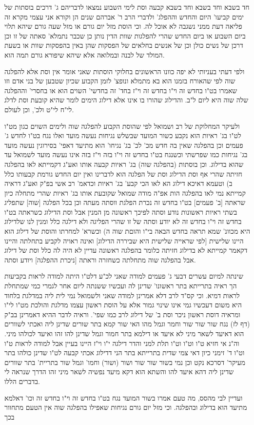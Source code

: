 \documentclass[12pt, openany]{book}
\begin{document}
חד בשבא וחד בשבא וחד בשבא קבעה וסת לימי השבוע נמצאו לדבריהם ג' דרכים בוסתות של ימים קביעו' היום והחדש וההפלג' ולדברי הרב ר' אברהם שנים הן וקורא אני עצמי מקרא זה פליאה דעת ממני נשגבה לא אוכל לה. וכי הוסת מזל יום גורם או מזל שעה גורם שיהא תלוי ביום השבוע או ביום החדש שהרי להפלגות שוות הדין נותן כן שכבר נתמלא' סאתה של זו וכן דרכן של נשים כולן וכן של אנשים בחלאים של הפסקות שהן באין בהפסקות שוות או בשעת המולד של לבנה ובמלואה אלא שיהא שיפורא גורם תמה הוא.\par ולפי דעתי בעניותי לא יפה כוונו הראשונים בחלוקי הוסתות שאני אומר אין וסת אלא להפלגה שוה לפי שהאורח בזמנו הוא בא מתמלא ונופצ' לזמן הקבוע שכיון שטבען של בני אדם וזו שאמרו בט"ו בחדש זה וי"ו בחדש זה וי"ז בחד' זה בחדשי' השוים הוא או בחסרי' וההפלגה שלה שוה היא ליום ל"ב. והדילוג שהורו בו אינו אלא דילוג הימים לומר שהיא קובעת וסת לדלג לי"ח לי"ט ולכ', וכן לעולם.\par ולעיקר המחלוקת של רב ושמואל לפי שהוסת הקבוע להפלגה שוה ולימים השוים כגון מט"ו לט"ו בג' ראיות הוא נקבע כשור המועד שבשלש נגיחות נעשה מועד ואלו נגח בט"ו לחדש ג' פעמים וכן בהפלגה שאין בה חדש מכ' לכ' בג' נגיחו' הוא מתיעד דאפי' בסירוגין נעשה מועד בג' נגיחות כמו שפרשתי וכשנגח בט"ו בחדש זה וי"ו בזה וי"ז בזה אינו נעשה מועד לשמואל עד שהוא בדילוג. וכן בוסתות (בהפלגה שוה) בג' ראיות קבעה אותו ואע"ג דקמייתא לאו בהפלגה חזיתה שהרי אף וסת הדילוג וסת של הפלגה הוא לדברינו ואין יום החדש גורמת קבעותו כלל ב) וטעמא דאיכא דילוג הא לאו הכי קבע' בג' ראיות וכדאמ' רב אשי בפ"ק ואע"ג דראיה קמייתא נמי לאו בהפלגה הות אפ"ה מודה שמואל שקובעת אותו בג' ראיות שהרי מתחלה כיון שראתה [ב' פעמים] בט"ו בחדש זה נכרת הפלגת ווסתה מעתה וכן בכל הפלגה [שוה] שתפליג בשתי ראיות ראשונות נודע וסתה לפיכך ראשונה מן המנין אבל וסת הדילוג כשראתה בט"ו בחדש זה וי"ו בחדש זה לא יודע וסתה של זו שהרי הפליגה ולא דילגה כלל ומנין לנו שלדילוג היא מכוונ' שמא תראה בחדש הבאה בי"ו והוםת שוה ה) וכשרא' למחרתו והוסת של דילוג הוא היינו שלישית {\small [לפי שראייה שלישית היא שביררה הדילוג]} ואינה ראויה לקביע בתחלתה והיינו דקאמר קמייתא לא בדילוג חזיתה כלומר בהפלגה ראשונה עדיין לא היה לה כלל וסת של דילוג אבל בהפלגה שוה מתחלתה כשחזרה וראתה [ניכרת ההפלגה] ויודע וסתה.\par [והא דאמרינן] שינתה למיום עשרים דבעי ג' פעמים למודה שאני לכ"ע דלט"ו היתה למודה לראות בקביעות הך ראיה בתרייתא בתר ראשונו' שדינן לה ועכשיו ששנתה ליום אחר לגמרי כמי שמתחלת לראות דמיא. וכי קס"ד לרב דלא אמרינן למודה שאני ולשמואל נמי לית ליה במדלגת בלחוד היא משום דעכשיו גמי אינו שינוי גמור אלא על הוסת ראשון עצמו מדלגת והולכת מט"ו לי"ו ומראיה דוסת ראשון ניכר וסת ב' של דילוג לרב כמו שפי'. וראיה לדבר ההיא דאמרינן בב"ק (דף לז) נגח שור שור שור וחמר וגמל מהו האי שור קמא בתר שורים שדינן ליה ואכתי לשוורים הוא דאיעד לשאר מיני לא איעד או דילמא בתר חמור וגמל שדינן להו זהו ואיעד לכולהו מיני. וה"נ אי חזיא ט"ו וט"ו וט"ו תלת למני והדר דילגה י"ו וי"ז היינו בעיין אבל למודה לראות ט"ו וט"ו ד' זימני כיון דאי צמי שדית בתרייתא בתר הני דדילוג אכתי קבעה לט"ו שדינן כולהו בתר מעיקר' דסרכא נקט וכן נמי בשור שור שור ושור (ושור) וחמו' וגמל שור בתריית' בתר שוורים שדינן ליה דהא איעד להו והשתא הוא דקא מיעד נפשיה לשאר מיני זהו הדרך שנראה לי בדברים הללו.\par ועדיין לבי מהסס, מה טעם אמרו בשור המועד נגח בט"ו בחדש זה וי"ו בחדש זה וכו' דאלמא מתיעד הוא בדילוג ובהפלגה. וכי מזל יום גורם נגיחות שאפילו בהפלגה שוה אין הטעם מתחוור בכך 
\end{document}
